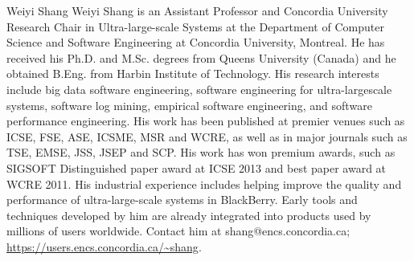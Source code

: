\documentclass[10pt,journal,compsoc]{IEEEtran}
\begin{document}
\begin{IEEEbiography}{Weiyi Shang}
Weiyi Shang is an Assistant Professor and Concordia University Research Chair in Ultra-large-scale Systems at the Department of Computer Science and Software Engineering at Concordia University, Montreal.
He has received his Ph.D. and M.Sc. degrees from Queens University (Canada) and he obtained B.Eng.
from Harbin Institute of Technology. His research interests include big data software engineering, software
engineering for ultra-largescale systems, software log mining, empirical software engineering, and software
performance engineering. His work has been published at premier venues such as ICSE, FSE, ASE, ICSME,
MSR and WCRE, as well as in major journals such as TSE, EMSE, JSS, JSEP and SCP. His work has won
premium awards, such as SIGSOFT Distinguished paper award at ICSE 2013 and best paper award at WCRE
2011. His industrial experience includes helping improve the quality and performance of ultra-large-scale
systems in BlackBerry. Early tools and techniques developed by him are already integrated into products
used by millions of users worldwide. Contact him at shang@encs.concordia.ca; \url{https://users.encs.concordia.ca/~shang}.
\end{IEEEbiography}


\clearpage

\appendices
\end{document}
